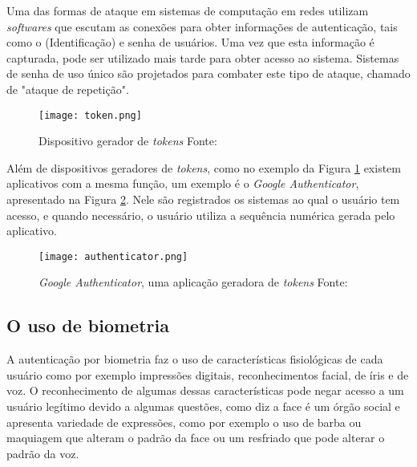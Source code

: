 \begin{citacao}
Uma das formas de ataque em sistemas de computação em redes utilizam \textit{softwares} que escutam as conexões para obter informações de autenticação, tais como o  (Identificação) e senha de usuários. Uma vez que esta informação é capturada, pode ser utilizado mais tarde para obter acesso ao sistema. Sistemas de senha de uso único são projetados para combater este tipo de ataque, chamado de "ataque de repetição".\cite{rfc2289}
\end{citacao}

\vspace{-3mm}
\begin{figure}[!htb]
	\centering
	\texttt{[image: token.png]}
	\vspace{-3mm}
	\footnotesize
	\caption[Dispositivo gerador de \textit{tokens}]{Dispositivo gerador de \textit{tokens} Fonte: \cite{rationalcdn}}
	\label{fig:token}
\end{figure}

Além de dispositivos geradores de \textit{tokens}, como no exemplo da Figura \ref{fig:token} existem aplicativos com a mesma função, um exemplo é o \textit{Google Authenticator}, apresentado na Figura \ref{fig:tokenapp}. Nele são registrados os sistemas ao qual o usuário tem acesso, e quando necessário, o usuário utiliza a sequência numérica gerada pelo aplicativo.

\vspace{-3mm}
\begin{figure}[!htb]
	\centering
	\texttt{[image: authenticator.png]}
	\vspace{-2mm}
	\caption[\textit{Google Authenticator}, uma aplicação geradora de \textit{tokens}]{\textit{Google Authenticator}, uma aplicação geradora de \textit{tokens} Fonte: \cite{authenticator}}
	\label{fig:tokenapp}
\end{figure}

\subsection{O uso de biometria}
A autenticação por biometria faz o uso de características fisiológicas de cada usuário como por exemplo impressões digitais, reconhecimentos facial, de íris e de voz.
O reconhecimento de algumas dessas características pode negar acesso a um usuário legítimo devido a algumas questões, como diz \cite{Daugman2004} a face é um órgão social e apresenta variedade de expressões, como por exemplo o uso de barba ou maquiagem que alteram o padrão da face ou um resfriado que pode alterar o padrão da voz.

